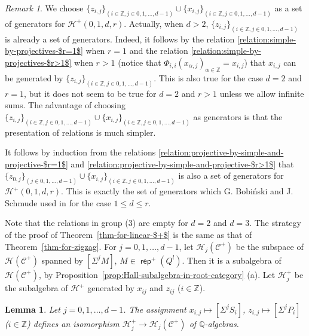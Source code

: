 \documentclass[reqno,12pt,a4paper]{amsart}
\newtheorem{lemma}[theorem]{Lemma}
\theoremstyle{remark}
\newtheorem{remark}[theorem]{Remark}
\theoremstyle{definition}
\newcommand{\opname}[1]{\operatorname{\mathsf{#1}}}
\newcommand{\rep}{\opname{rep}\nolimits}
\newcommand{\cc}{{\mathcal C}}
\newcommand{\ch}{{\mathcal H}}
\numberwithin{equation}{section}
\begin{document}
\begin{remark}
\label{rem:other-generators}
We choose $\{z_{i,j}\}_{(i\in \mathbb{Z},j\in 0,1,\ldots, d-1)}\cup \{x_{i,j}\}_{(i\in \mathbb{Z},j\in 0,1,\ldots, d-1)}$ as a set of generators for $\ch^+(0,1,d,r)$. Actually, when $d>2$, $\{z_{i,j}\}_{(i\in \mathbb{Z},j\in 0,1,\ldots, d-1)}$ is already a set of generators. Indeed, it follows by the relation \eqref{relation:simple-by-projectives-$r=1$} when $r=1$ and the relation \eqref{relation:simple-by-projectives-$r>1$} when $r>1$ (notice that $\Phi_{i,i}(x_{\alpha,j})_{\alpha\in\mathbb{Z}}=x_{i,j}$) that $x_{i,j}$ can be generated by $\{z_{i,j}\}_{(i\in \mathbb{Z},j\in 0,1,\ldots, d-1)}$. This is also true for the case $d=2$ and $r=1$, but it does not seem to be true for $d=2$ and $r>1$ unless we allow infinite sums. The advantage of choosing $\{z_{i,j}\}_{(i\in \mathbb{Z},j\in 0,1,\ldots, d-1)}\cup \{x_{i,j}\}_{(i\in \mathbb{Z},j\in 0,1,\ldots, d-1)}$ as generators is that the presentation of relations is much simpler. 
	
It follows by induction from the relations \eqref{relation:projective-by-simple-and-projective-$r=1$} and \eqref{relation:projective-by-simple-and-projective-$r>1$} that $\{z_{0,j}\}_{(j\in 0,1,\ldots, d-1)}\cup \{x_{i,j}\}_{(i\in \mathbb{Z},j\in 0,1,\ldots, d-1)}$ is also a set of generators for $\ch^+(0,1,d,r)$. This is exactly the set of generators which G. Bobi\'{n}ski and J. Schmude used in \cite{BobinskiSchmude20} for the case $1\leq d\leq r$.  
\end{remark}

Note that the relations in group (3) are empty for $d=2$ and $d=3$. The strategy of the proof of Theorem~\ref{thm-for-linear-$+$} is the same as that of Theorem~\ref{thm-for-zigzag}.
For $j=0,1,\ldots,d-1$, let $\ch_j(\cc^+)$ be the subspace of $\ch(\cc^+)$ spanned by $[\Sigma^j M]$, $M\in\rep^+(Q^l)$. Then it is a subalgebra of $\ch(\cc^+)$, by Proposition~\ref{prop:Hall-subalgebra-in-root-category} (a). Let $\ch^+_j$ be the subalgebra of $\ch^+$ generated by $x_{ij}$ and $z_{ij}$ ($i\in\mathbb{Z}$).

\begin{lemma}
	\label{lem:relations-in-the-first-group-linear-projectives}
	Let $j=0,1,\ldots,d-1$.
	The assignment $x_{i,j}\mapsto [\Sigma^j S_i]$, $z_{i,j}\mapsto [\Sigma^j P_i]$  ($i\in\mathbb{Z}$) defines an isomorphism $\ch^+_j\to\ch_j(\cc^+)$ of $\mathbb{Q}$-algebras.
\end{lemma}
\end{document}
